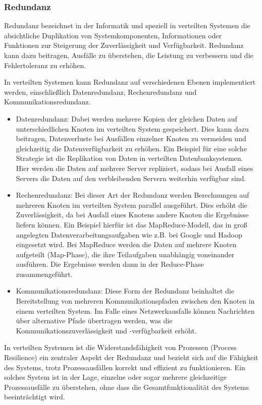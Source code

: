 \subsubsection{Redundanz}
Redundanz bezeichnet in der Informatik und speziell in verteilten Systemen die absichtliche Duplikation von Systemkomponenten, Informationen oder Funktionen zur Steigerung der Zuverlässigkeit und Verfügbarkeit. Redundanz kann dazu beitragen, Ausfälle zu überstehen, die Leistung zu verbessern und die Fehlertoleranz zu erhöhen.

In verteilten Systemen kann Redundanz auf verschiedenen Ebenen implementiert werden, einschließlich Datenredundanz, Rechenredundanz und Kommunikationsredundanz.
\begin{itemize}
\item Datenredundanz: Dabei werden mehrere Kopien der gleichen Daten auf unterschiedlichen Knoten im verteilten System gespeichert. Dies kann dazu beitragen, Datenverluste bei Ausfällen einzelner Knoten zu vermeiden und gleichzeitig die Datenverfügbarkeit zu erhöhen. Ein Beispiel für eine solche Strategie ist die Replikation von Daten in verteilten Datenbanksystemen. Hier werden die Daten auf mehrere Server repliziert, sodass bei Ausfall eines Servers die Daten auf den verbleibenden Servern weiterhin verfügbar sind.
\item Rechenredundanz: Bei dieser Art der Redundanz werden Berechnungen auf mehreren Knoten im verteilten System parallel ausgeführt. Dies erhöht die Zuverlässigkeit, da bei Ausfall eines Knotens andere Knoten die Ergebnisse liefern können. Ein Beispiel hierfür ist das MapReduce-Modell, das in groß angelegten Datenverarbeitungsaufgaben wie z.B. bei Google und Hadoop eingesetzt wird. Bei MapReduce werden die Daten auf mehrere Knoten aufgeteilt (Map-Phase), die ihre Teilaufgaben unabhängig voneinander ausführen. Die Ergebnisse werden dann in der Reduce-Phase zusammengeführt.
\item Kommunikationsredundanz: Diese Form der Redundanz beinhaltet die Bereitstellung von mehreren Kommunikationspfaden zwischen den Knoten in einem verteilten System. Im Falle eines Netzwerkausfalls können Nachrichten über alternative Pfade übertragen werden, was die Kommunikationszuverlässigkeit und -verfügbarkeit erhöht.
\end{itemize}
In verteilten Systemen ist die Widerstandsfähigkeit von Prozessen (Process Resilience) ein zentraler Aspekt der Redundanz und bezieht sich auf die Fähigkeit des Systems, trotz Prozessausfällen korrekt und effizient zu funktionieren. Ein solches System ist in der Lage, einzelne oder sogar mehrere gleichzeitige Prozessausfälle zu überstehen, ohne dass die Gesamtfunktionalität des Systems beeinträchtigt wird.

